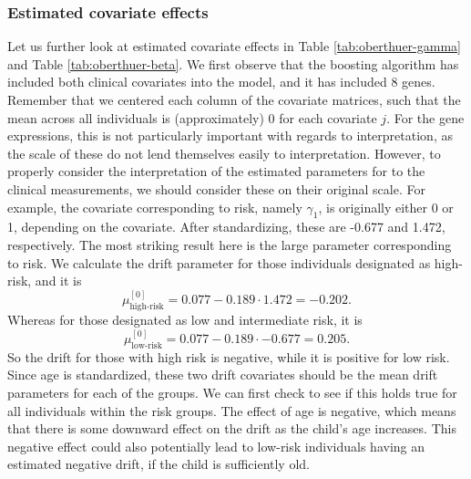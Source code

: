 \subsubsection{Estimated covariate effects}
Let us further look at estimated covariate effects in Table \ref{tab:oberthuer-gamma} and Table \ref{tab:oberthuer-beta}.
We first observe that the boosting algorithm has included both clinical covariates into the model, and it has included 8 genes.
Remember that we centered each column of the covariate matrices, such that the mean across all individuals is (approximately) 0 for each covariate $j$.
For the gene expressions, this is not particularly important with regards to interpretation, as the scale of these do not lend themselves easily to interpretation.
However, to properly consider the interpretation of the estimated parameters for to the clinical measurements, we should consider these on their original scale.
For example, the covariate corresponding to risk, namely $\gamma_1$, is originally either 0 or 1, depending on the covariate.
After standardizing, these are -0.677 and 1.472, respectively.
The most striking result here is the large parameter corresponding to risk.
We calculate the drift parameter for those individuals designated as high-risk, and it is
\begin{equation*}
    \mu^{[0]}_{\text{high-risk}}=0.077-0.189\cdot1.472=-0.202.
\end{equation*}
Whereas for those designated as low and intermediate risk, it is
\begin{equation*}
    \mu^{[0]}_{\text{low-risk}}=0.077-0.189\cdot-0.677=0.205.
\end{equation*}
So the drift for those with high risk is negative, while it is positive for low risk.
Since age is standardized, these two drift covariates should be the mean drift parameters for each of the groups.
We can first check to see if this holds true for all individuals within the risk groups.
The effect of age is negative, which means that there is some downward effect on the drift as the child's age increases.
This negative effect could also potentially lead to low-risk individuals having an estimated negative drift, if the child is sufficiently old.
